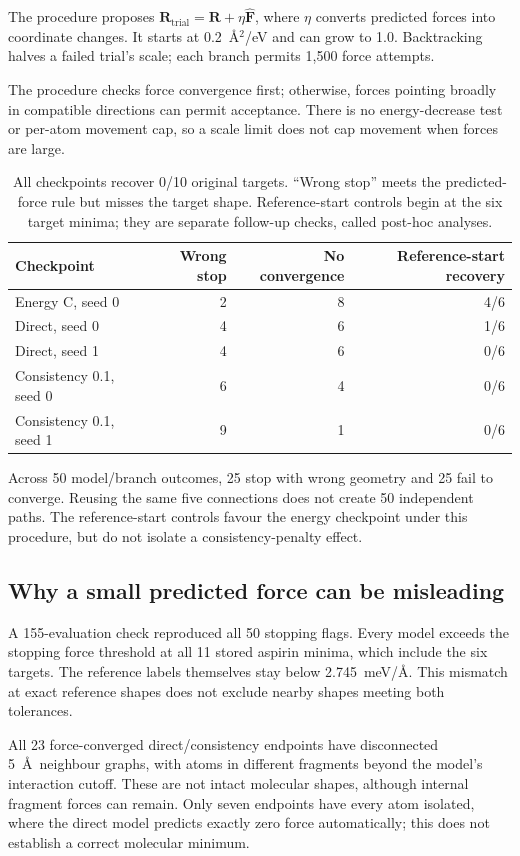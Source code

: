 \documentclass{article}
\begin{document}
The procedure proposes $\mathbf R_{\mathrm{trial}}=\mathbf R+\eta\widehat{\mathbf F}$, where $\eta$ converts predicted forces into coordinate changes. It starts at 0.2~\AA$^2$/eV and can grow to 1.0. Backtracking halves a failed trial's scale; each branch permits 1,500 force attempts.

The procedure checks force convergence first; otherwise, forces pointing broadly in compatible directions can permit acceptance. There is no energy-decrease test or per-atom movement cap, so a scale limit does not cap movement when forces are large.

\begin{table}[htbp]
\centering\small
\caption{All checkpoints recover 0/10 original targets. ``Wrong stop'' meets the predicted-force rule but misses the target shape. Reference-start controls begin at the six target minima; they are separate follow-up checks, called post-hoc analyses.}\label{tab:recovery}
\begin{tabular}{lrrr}\toprule
Checkpoint & Wrong stop & No convergence & Reference-start recovery\\\midrule
Energy C, seed 0 & 2 & 8 & 4/6\\
Direct, seed 0 & 4 & 6 & 1/6\\
Direct, seed 1 & 4 & 6 & 0/6\\
Consistency 0.1, seed 0 & 6 & 4 & 0/6\\
Consistency 0.1, seed 1 & 9 & 1 & 0/6\\\bottomrule
\end{tabular}
\end{table}

Across 50 model/branch outcomes, 25 stop with wrong geometry and 25 fail to converge. Reusing the same five connections does not create 50 independent paths. The reference-start controls favour the energy checkpoint under this procedure, but do not isolate a consistency-penalty effect.
\subsection{Why a small predicted force can be misleading}
A 155-evaluation check reproduced all 50 stopping flags. Every model exceeds the stopping force threshold at all 11 stored aspirin minima, which include the six targets. The reference labels themselves stay below 2.745~meV/\AA. This mismatch at exact reference shapes does not exclude nearby shapes meeting both tolerances.

All 23 force-converged direct/consistency endpoints have disconnected 5~\AA\ neighbour graphs, with atoms in different fragments beyond the model's interaction cutoff. These are not intact molecular shapes, although internal fragment forces can remain. Only seven endpoints have every atom isolated, where the direct model predicts exactly zero force automatically; this does not establish a correct molecular minimum.
\end{document}
